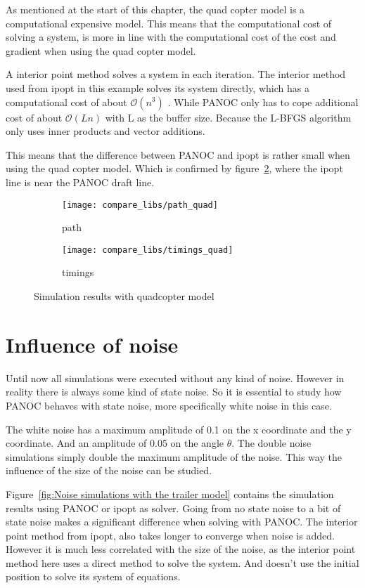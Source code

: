 As mentioned at the start of this chapter, the quad copter model is a computational expensive model. This means that the computational cost of solving a system, is more in line with the computational cost of the cost and gradient when using the quad copter model.

A interior point method solves a system in each iteration. The interior method used from ipopt in this example solves its system directly, which has a computational cost of about $\mathcal{O}(n^3)$ . While PANOC only has to cope additional cost of about $\mathcal{O}(Ln)$ with L as the buffer size.  Because the L-BFGS algorithm only uses inner products and vector additions.

This means that the difference between PANOC and ipopt is rather small when using the quad copter model. Which is confirmed by figure~\ref{fig:timings trailer quad}, where the ipopt line is near the PANOC draft line.
\begin{figure}[H]
	\centering
	\begin{subfigure}[b]{0.45\textwidth}
		\centering
		\texttt{[image: compare\_libs/path\_quad]}
		\caption{path}
		\label{fig:solution path trailer quad}
	\end{subfigure}
	\hfill
	\begin{subfigure}[b]{0.45\textwidth}
		\centering
		\texttt{[image: compare\_libs/timings\_quad]}
		\caption{timings}
		\label{fig:timings trailer quad}
	\end{subfigure}
	\caption{Simulation results with quadcopter model}
	\label{fig:Simulation results with quadcopter}
\end{figure}

\section{Influence of noise}
Until now all simulations were executed without any kind of noise. However in reality there is always some kind of state noise. So it is essential to study how PANOC behaves with state noise, more specifically white noise in this case.

The white noise has a maximum amplitude of 0.1 on the x coordinate and the y coordinate. And an amplitude of 0.05 on the angle $\theta$. The double noise simulations simply double the maximum amplitude of the noise. This way the influence of the size of the noise can be studied.

Figure~\ref{fig:Noise simulations with the trailer model} contains the simulation results using PANOC or ipopt as solver. Going from no state noise to a bit of state noise makes a significant difference when solving with PANOC. The interior point method from ipopt, also takes longer to converge when noise is added. However it is much less correlated with the size of the noise, as the interior point method here uses a direct method to solve the system. And doesn't use the initial position to solve its system of equations. 

